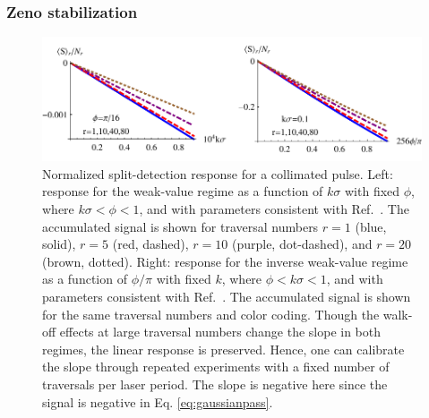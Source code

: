 \subsubsection{Zeno stabilization}\label{sec:zeno}
\begin{figure}[t]
  \begin{center}
    \centerline{\includegraphics[width=6in]{PulsedRecycling/Figures/responseplot.pdf}}
  \end{center}
  \caption[Linear detector response in the weak value and inverse weak value parameter regimes.]{Normalized split-detection response for a collimated pulse.  Left: response for the weak-value regime as a function of $k\sigma$ with fixed $\phi$, where $k\sigma < \phi < 1$, and with parameters consistent with Ref.~\cite{Dixon2009}.  The accumulated signal is shown for traversal numbers $r=1$ (blue, solid), $r=5$ (red, dashed), $r=10$ (purple, dot-dashed), and $r=20$ (brown, dotted).  Right: response for the inverse weak-value regime as a function of $\phi / \pi$ with fixed $k$, where $\phi < k\sigma < 1$, and with parameters consistent with Ref.~\cite{Starling2010a,Starling2010b}.  The accumulated signal is shown for the same traversal numbers and color coding.  Though the walk-off effects at large traversal numbers change the slope in both regimes, the linear response is preserved.  Hence, one can calibrate the slope through repeated experiments with a fixed number of traversals per laser period.  The slope is negative here since the signal is negative in Eq. \eqref{eq:gaussianpass}.}
  \label{fig:collimatedsplitresponse}
\end{figure}

